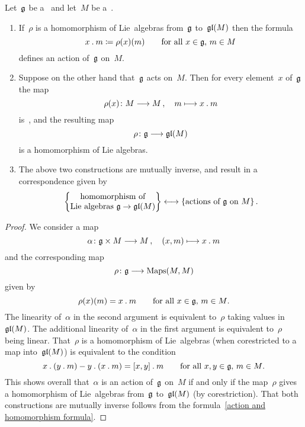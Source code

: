 \begin{proposition}
  \label{correspodence between representations and actions}
  Let~$\mathfrak{g}$ be a~\liealgebra{$\kf$} and let~$M$ be a~\vectorspace{$\kf$}.
  \begin{enumerate}
    \item
      If~$\rho$ is a homomorphism of Lie~algebras from~$\mathfrak{g}$ to~$\mathfrak{gl}(M)$ then the formula
      \[
        x \mathbin{.} m \coloneqq \rho(x)(m)
        \qquad
        \text{for all~$x \in \mathfrak{g}$,~$m \in M$}
      \]
      defines an action of~$\mathfrak{g}$ on~$M$.
    \item
      Suppose on the other hand that~$\mathfrak{g}$ acts on~$M$.
      Then for every element~$x$ of~$\mathfrak{g}$ the map
      \[
        \rho(x) \colon M \to M \,,
        \quad
        m \mapsto x \act m
      \]
      is~\linear{$\kf$}, and the resulting map
      \[
        \rho \colon \glie \to \gllie(M)
      \]
      is a homomorphism of Lie algebras.
    \item
      The above two constructions are mutually inverse, and result in a {\onetoonetext} correspondence given by
      \[
        \left\{
          \begin{tabular}{@{}c@{}}
            homomorphism of
            \\
            Lie~algebras~$\glie \to \gllie(M)$
          \end{tabular}
        \right\}
        \onetoone
        \{
          \text{actions of~$\glie$ on~$M$}
        \} \,.
      \]
  \end{enumerate}
\end{proposition}


\begin{proof}
  We consider a map
  \[
    \alpha
    \colon
    \glie \times M
    \to
    M \,,
    \quad
    (x,m)
    \mapsto
    x \act m
  \]
  and the corresponding map
  \[
    \rho
    \colon
    \glie
    \to
    \Maps(M,M)
  \]
  given by
  \begin{equation}
    \label{action and homomorphism formula}
    \rho(x)(m) = x \mathbin{.} m
    \qquad
    \text{for all~$x \in \mathfrak{g}$,~$m \in M$.}
  \end{equation}
  The linearity of~$\alpha$ in the second argument is equivalent to~$\rho$ taking values in~$\mathfrak{gl}(M)$.
  The additional linearity of~$\alpha$ in the first argument is equivalent to~$\rho$ being linear.
  That~$\rho$ is a homomorphism of Lie~algebras (when corestricted to a map into~$\mathfrak{gl}(M)$) is equivalent to the condition
  \[
    x \mathbin{.} (y \mathbin{.} m) - y \mathbin{.} (x \mathbin{.} m)
    =
    [x,y] \mathbin{.} m
    \qquad
    \text{for all~$x, y \in \mathfrak{g}$,~$m \in M$.}
  \]
  This shows overall that~$\alpha$ is an action of~$\mathfrak{g}$ on~$M$ if and only if the map~$\rho$ gives a homomorphism of Lie~algebras from~$\mathfrak{g}$ to~$\mathfrak{gl}(M)$ (by corestriction).
  That both constructions are mutually inverse follows from the formula~\eqref{action and homomorphism formula}.
\end{proof}


